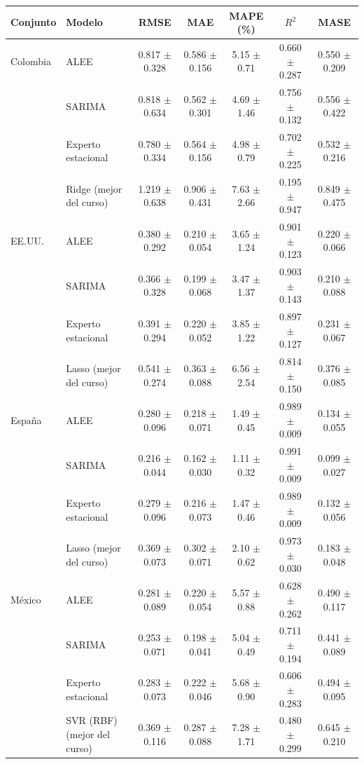 \begin{tabular}{llccccc}
\toprule
Conjunto & Modelo & RMSE & MAE & MAPE (\%) & $R^2$ & MASE \\
\midrule
Colombia & ALEE & 0.817 $\pm$ 0.328 & 0.586 $\pm$ 0.156 & 5.15 $\pm$ 0.71 & 0.660 $\pm$ 0.287 & 0.550 $\pm$ 0.209 \\
 & SARIMA & 0.818 $\pm$ 0.634 & 0.562 $\pm$ 0.301 & 4.69 $\pm$ 1.46 & 0.756 $\pm$ 0.132 & 0.556 $\pm$ 0.422 \\
 & Experto estacional & 0.780 $\pm$ 0.334 & 0.564 $\pm$ 0.156 & 4.98 $\pm$ 0.79 & 0.702 $\pm$ 0.225 & 0.532 $\pm$ 0.216 \\
 & Ridge (mejor del curso) & 1.219 $\pm$ 0.638 & 0.906 $\pm$ 0.431 & 7.63 $\pm$ 2.66 & 0.195 $\pm$ 0.947 & 0.849 $\pm$ 0.475 \\
\midrule
EE.UU. & ALEE & 0.380 $\pm$ 0.292 & 0.210 $\pm$ 0.054 & 3.65 $\pm$ 1.24 & 0.901 $\pm$ 0.123 & 0.220 $\pm$ 0.066 \\
 & SARIMA & 0.366 $\pm$ 0.328 & 0.199 $\pm$ 0.068 & 3.47 $\pm$ 1.37 & 0.903 $\pm$ 0.143 & 0.210 $\pm$ 0.088 \\
 & Experto estacional & 0.391 $\pm$ 0.294 & 0.220 $\pm$ 0.052 & 3.85 $\pm$ 1.22 & 0.897 $\pm$ 0.127 & 0.231 $\pm$ 0.067 \\
 & Lasso (mejor del curso) & 0.541 $\pm$ 0.274 & 0.363 $\pm$ 0.088 & 6.56 $\pm$ 2.54 & 0.814 $\pm$ 0.150 & 0.376 $\pm$ 0.085 \\
\midrule
España & ALEE & 0.280 $\pm$ 0.096 & 0.218 $\pm$ 0.071 & 1.49 $\pm$ 0.45 & 0.989 $\pm$ 0.009 & 0.134 $\pm$ 0.055 \\
 & SARIMA & 0.216 $\pm$ 0.044 & 0.162 $\pm$ 0.030 & 1.11 $\pm$ 0.32 & 0.991 $\pm$ 0.009 & 0.099 $\pm$ 0.027 \\
 & Experto estacional & 0.279 $\pm$ 0.096 & 0.216 $\pm$ 0.073 & 1.47 $\pm$ 0.46 & 0.989 $\pm$ 0.009 & 0.132 $\pm$ 0.056 \\
 & Lasso (mejor del curso) & 0.369 $\pm$ 0.073 & 0.302 $\pm$ 0.071 & 2.10 $\pm$ 0.62 & 0.973 $\pm$ 0.030 & 0.183 $\pm$ 0.048 \\
\midrule
México & ALEE & 0.281 $\pm$ 0.089 & 0.220 $\pm$ 0.054 & 5.57 $\pm$ 0.88 & 0.628 $\pm$ 0.262 & 0.490 $\pm$ 0.117 \\
 & SARIMA & 0.253 $\pm$ 0.071 & 0.198 $\pm$ 0.041 & 5.04 $\pm$ 0.49 & 0.711 $\pm$ 0.194 & 0.441 $\pm$ 0.089 \\
 & Experto estacional & 0.283 $\pm$ 0.073 & 0.222 $\pm$ 0.046 & 5.68 $\pm$ 0.90 & 0.606 $\pm$ 0.283 & 0.494 $\pm$ 0.095 \\
 & SVR (RBF) (mejor del curso) & 0.369 $\pm$ 0.116 & 0.287 $\pm$ 0.088 & 7.28 $\pm$ 1.71 & 0.480 $\pm$ 0.299 & 0.645 $\pm$ 0.210 \\
\bottomrule
\end{tabular}
